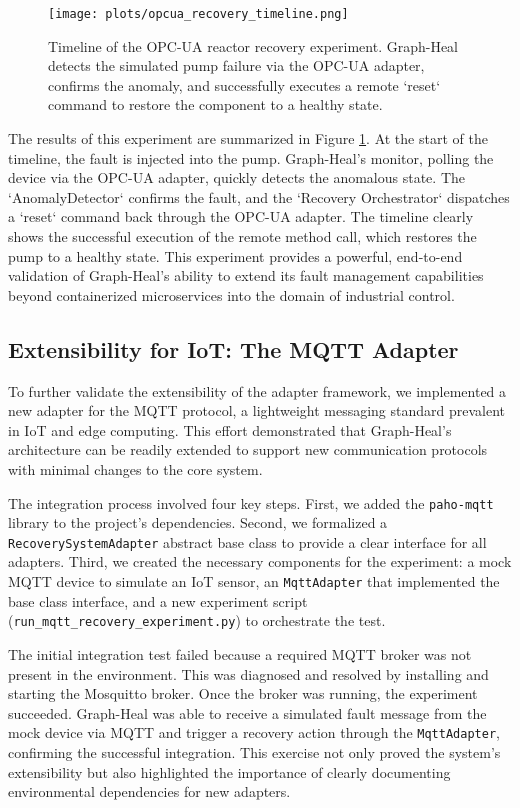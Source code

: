 \documentclass[11pt,conference]{IEEEtran}
\begin{document}
\begin{figure}[ht]
  \centering
  \texttt{[image: plots/opcua\_recovery\_timeline.png]}
  \caption{Timeline of the OPC-UA reactor recovery experiment. Graph-Heal detects the simulated pump failure via the OPC-UA adapter, confirms the anomaly, and successfully executes a remote `reset` command to restore the component to a healthy state.}
  \label{fig:opcua-recovery}
\end{figure}

The results of this experiment are summarized in Figure \ref{fig:opcua-recovery}. At the start of the timeline, the fault is injected into the pump. Graph-Heal's monitor, polling the device via the OPC-UA adapter, quickly detects the anomalous state. The `AnomalyDetector` confirms the fault, and the `Recovery Orchestrator` dispatches a `reset` command back through the OPC-UA adapter. The timeline clearly shows the successful execution of the remote method call, which restores the pump to a healthy state. This experiment provides a powerful, end-to-end validation of Graph-Heal's ability to extend its fault management capabilities beyond containerized microservices into the domain of industrial control.

\subsection{Extensibility for IoT: The MQTT Adapter}
To further validate the extensibility of the adapter framework, we implemented a new adapter for the MQTT protocol, a lightweight messaging standard prevalent in IoT and edge computing. This effort demonstrated that Graph-Heal's architecture can be readily extended to support new communication protocols with minimal changes to the core system.

The integration process involved four key steps. First, we added the \texttt{paho-mqtt} library to the project's dependencies. Second, we formalized a \texttt{RecoverySystemAdapter} abstract base class to provide a clear interface for all adapters. Third, we created the necessary components for the experiment: a mock MQTT device to simulate an IoT sensor, an \texttt{MqttAdapter} that implemented the base class interface, and a new experiment script (\texttt{run\_mqtt\_recovery\_experiment.py}) to orchestrate the test.

The initial integration test failed because a required MQTT broker was not present in the environment. This was diagnosed and resolved by installing and starting the Mosquitto broker. Once the broker was running, the experiment succeeded. Graph-Heal was able to receive a simulated fault message from the mock device via MQTT and trigger a recovery action through the \texttt{MqttAdapter}, confirming the successful integration. This exercise not only proved the system's extensibility but also highlighted the importance of clearly documenting environmental dependencies for new adapters.
\end{document}

